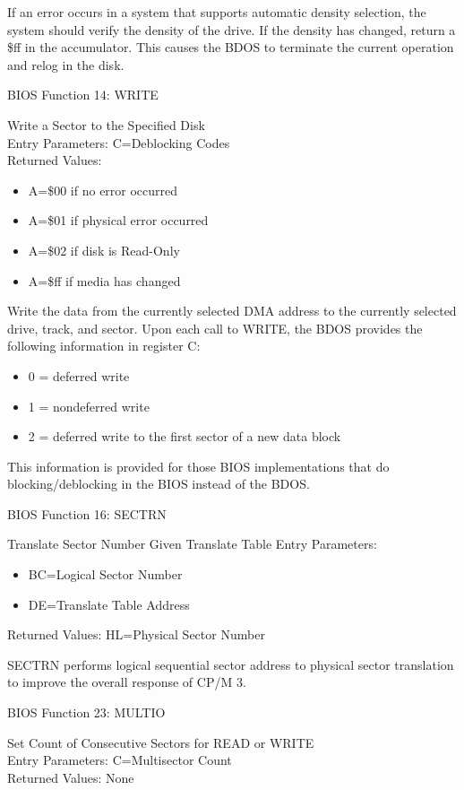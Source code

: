 If an error occurs in a system that supports automatic density
selection, the system should verify the density of the drive. If the
density has changed, return a \$ff in the accumulator. This causes the
BDOS to terminate the current operation and relog in the disk.

BIOS Function 14: WRITE

Write a Sector to the Specified Disk\\
Entry Parameters: C=Deblocking Codes\\
Returned Values:
\begin{itemize}
\item[] A=\$00 if no error occurred
\item[] A=\$01 if physical error occurred
\item[] A=\$02 if disk is Read-Only
\item[] A=\$ff if media has changed
\end{itemize}

Write the data from the currently selected DMA address to the
currently selected drive, track, and sector. Upon each call to WRITE,
the BDOS provides the following information in register C:
\begin{itemize}
\item[] 0 = deferred write
\item[] 1 = nondeferred write
\item[] 2 = deferred write to the first sector of a new data block
\end{itemize}

This information is provided for those BIOS implementations that do
blocking/deblocking in the BIOS instead of the BDOS.

BIOS Function 16: SECTRN

Translate Sector Number Given Translate Table
Entry Parameters:
\begin{itemize}
\item[] BC=Logical Sector Number
\item[] DE=Translate Table Address
\end{itemize}
Returned Values: HL=Physical Sector Number

SECTRN performs logical sequential sector address to physical sector
translation to improve the overall response of CP/M 3.

BIOS Function 23: MULTIO

Set Count of Consecutive Sectors for READ or WRITE\\
Entry Parameters: C=Multisector Count\\
Returned Values: None

